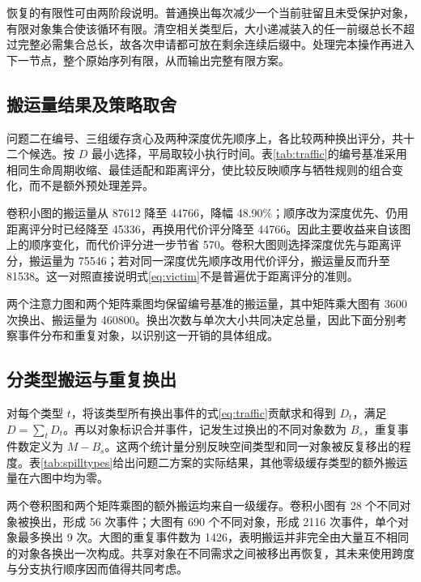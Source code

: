 恢复的有限性可由两阶段说明。普通换出每次减少一个当前驻留且未受保护对象，有限对象集合使该循环有限。清空相关类型后，大小递减装入的任一前缀总长不超过完整必需集合总长，故各次申请都可放在剩余连续后缀中。处理完本操作再进入下一节点，整个原始序列有限，从而输出完整有限方案。

\subsection{搬运量结果及策略取舍}
问题二在编号、三组缓存贪心及两种深度优先顺序上，各比较两种换出评分，共十二个候选。按 $D$ 最小选择，平局取较小执行时间。表\ref{tab:traffic}的编号基准采用相同生命周期收缩、最佳适配和距离评分，使比较反映顺序与牺牲规则的组合变化，而不是额外预处理差异。
\begin{table}[H]\centering\caption{问题二的额外搬运量与换出次数}\label{tab:traffic}
\end{table}

卷积小图的搬运量从 87612 降至 44766，降幅 48.90\%；顺序改为深度优先、仍用距离评分时已经降至 45336，再换用代价评分降至 44766。因此主要收益来自该图上的顺序变化，而代价评分进一步节省 570。卷积大图则选择深度优先与距离评分，搬运量为 75546；若对同一深度优先顺序改用代价评分，搬运量反而升至 81538。这一对照直接说明式\eqref{eq:victim}不是普遍优于距离评分的准则。

两个注意力图和两个矩阵乘图均保留编号基准的搬运量，其中矩阵乘大图有 3600 次换出、搬运量为 460800。换出次数与单次大小共同决定总量，因此下面分别考察事件分布和重复对象，以识别这一开销的具体组成。

\subsection{分类型搬运与重复换出}
对每个类型 $t$，将该类型所有换出事件的式\eqref{eq:traffic}贡献求和得到 $D_t$，满足 $D=\sum_tD_t$。再以对象标识合并事件，记发生过换出的不同对象数为 $B_s$，重复事件数定义为 $M-B_s$。这两个统计量分别反映空间类型和同一对象被反复移出的程度。表\ref{tab:spilltypes}给出问题二方案的实际结果，其他零级缓存类型的额外搬运量在六图中均为零。
\begin{table}[H]\centering{}
\caption{额外搬运的缓存类型与重复事件}\label{tab:spilltypes}
\end{table}

两个卷积图和两个矩阵乘图的额外搬运均来自一级缓存。卷积小图有 28 个不同对象被换出，形成 56 次事件；大图有 690 个不同对象，形成 2116 次事件，单个对象最多换出 9 次。大图的重复事件数为 1426，表明搬运并非完全由大量互不相同的对象各换出一次构成。共享对象在不同需求之间被移出再恢复，其未来使用跨度与分支执行顺序因而值得共同考虑。

